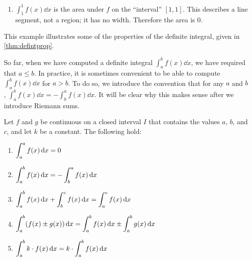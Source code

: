 \begin{example}
\begin{enumerate}
		
	\item	$\int_1^1f(x)\dd x$ is the area under $f$ on the ``interval'' $[1,1]$. This describes a line segment, not a region; it has no width. Therefore the area is 0.
\end{enumerate}
\end{example}

This example illustrates some of the properties of the definite integral, given in \autoref{thm:defintprop}.

So far, when we have computed a definite integral $\int_a^b f(x)\dd x$, we have required that $a\leq b$. In practice, it is sometimes convenient to be able to compute $\int_a^b f(x)\dd x$ for $a>b$. To do so, we introduce the convention that for any $a$ and $b$, $\int_a^b f(x)\dd x=-\int_b^a f(x)\dd x$. It will be clear why this makes sense after we introduce Riemann sums.

\begin{theorem}\label{thm:defintprop}%
Let $f$ and $g$ be continuous on a closed interval $I$ that contains the values $a$, $b$, and $c$, and let $k$ be a constant. The following hold:
\begin{enumerate}
	\item $\displaystyle\int_a^a f(x)\operatorname{d}\! x=0$
	\item $\displaystyle\int_a^b f(x)\operatorname{d}\! x=-\int_b^a f(x)\operatorname{d}\! x$
	\item $\displaystyle\int_a^b f(x)\operatorname{d}\! x+\int_b^c f(x)\operatorname{d}\! x=\int_a^c f(x)\operatorname{d}\! x$
	\item $\displaystyle\int_a^b (f(x)\pm g(x))\operatorname{d}\! x =\int_a^b f(x)\operatorname{d}\! x \pm \int_a^b g(x)\operatorname{d}\! x$
	\item $\displaystyle\int_a^b k\cdot f(x)\operatorname{d}\! x =k\cdot \int_a^b f(x)\operatorname{d}\! x$
\end{enumerate}%
\end{theorem}

